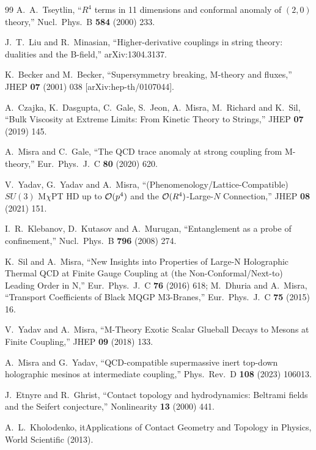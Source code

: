 \documentclass[a4paper,11pt,fleqn]{article}
\theoremstyle{plain}
\theoremstyle{definition}
\begin{document}
\begin{thebibliography}{99}
A.~A.~Tseytlin,
``$R^4$ terms in 11 dimensions and conformal anomaly of $(2,0)$ theory,''
Nucl.\ Phys.\ B {\bf 584} (2000) 233.

J.~T.~Liu and R.~Minasian,
``Higher-derivative couplings in string theory: dualities and the B-field,''
arXiv:1304.3137.

K.~Becker and M.~Becker,
``Supersymmetry breaking, M-theory and fluxes,''
JHEP {\bf 07} (2001) 038
[arXiv:hep-th/0107044].

A.~Czajka, K.~Dasgupta, C.~Gale, S.~Jeon, A.~Misra, M.~Richard and K.~Sil,
``Bulk Viscosity at Extreme Limits: From Kinetic Theory to Strings,''
JHEP {\bf 07} (2019) 145.

A.~Misra and C.~Gale,
``The QCD trace anomaly at strong coupling from M-theory,''
Eur.\ Phys.\ J.\ C {\bf 80} (2020) 620.

V.~Yadav, G.~Yadav and A.~Misra,
``(Phenomenology/Lattice-Compatible) $SU(3)$ M$\chi$PT HD up to ${\cal O}(p^4)$ and the ${\cal O}(R^4)$-Large-$N$ Connection,''
JHEP {\bf 08} (2021) 151.

I.~R.~Klebanov, D.~Kutasov and A.~Murugan,
``Entanglement as a probe of confinement,''
Nucl.\ Phys.\ B {\bf 796} (2008) 274.

K.~Sil and A.~Misra,
``New Insights into Properties of Large-N Holographic Thermal QCD at Finite Gauge Coupling at (the Non-Conformal/Next-to) Leading Order in N,''
Eur.\ Phys.\ J.\ C {\bf 76} (2016) 618;
M.~Dhuria and A.~Misra,
``Transport Coefficients of Black MQGP M3-Branes,''
Eur.\ Phys.\ J.\ C {\bf 75} (2015) 16.

V.~Yadav and A.~Misra,
``M-Theory Exotic Scalar Glueball Decays to Mesons at Finite Coupling,''
JHEP {\bf 09} (2018) 133.

A.~Misra and G.~Yadav,
``QCD-compatible supermassive inert top-down holographic mesinos at intermediate coupling,''
Phys.\ Rev.\ D {\bf 108} (2023) 106013.

J.~Etnyre and R.~Ghrist,
``Contact topology and hydrodynamics: Beltrami fields and the Seifert conjecture,''
Nonlinearity {\bf 13} (2000) 441.

A.~L.~Kholodenko,
it{Applications of Contact Geometry and Topology in Physics},
World Scientific (2013).


\end{thebibliography}
\end{document}
